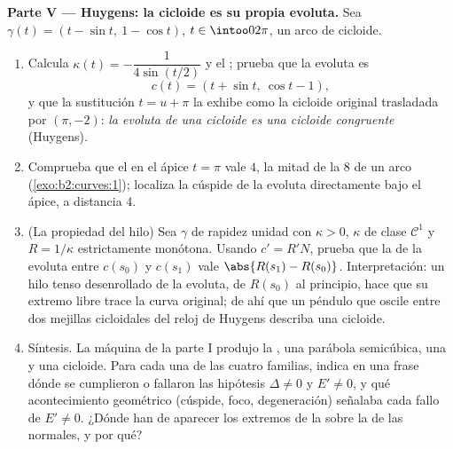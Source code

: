 \begin{problem}
\medskip
\noindent\textbf{Parte V --- Huygens: la cicloide es su propia
evoluta.} Sea $\gamma(t) = (t - \sin t,\ 1 - \cos t)$, $t \in
\intoo0{2\pi}$, un arco de cicloide.
\begin{enumerate}[resume]
  \item Calcula $\kappa(t) = -\dfrac1{4\sin(t/2)}$ y el
        ; prueba que la evoluta es
        \[
        c(t) = (t + \sin t,\ \cos t - 1),
        \]
        y que la sustitución $t = u + \pi$ la exhibe como la
        cicloide original trasladada por $(\pi, -2)$: \emph{la
        evoluta de una cicloide es una cicloide congruente}
        (Huygens).
  \item Comprueba que el  en el ápice $t = \pi$
        vale $4$, la mitad de la  $8$ de un arco
        (\cref{exo:b2:curves:1}); localiza la cúspide de la evoluta
        directamente bajo el ápice, a distancia $4$.
  \item (La propiedad del hilo) Sea $\gamma$ de rapidez unidad con
        $\kappa > 0$, $\kappa$ de clase $\mathcal C^1$ y $R =
        1/\kappa$ estrictamente monótona. Usando $c' = R'N$, prueba
        que la  de la evoluta entre $c(s_0)$ y
        $c(s_1)$ vale $\abs{R(s_1) - R(s_0)}$. Interpretación: un
        hilo tenso desenrollado de la evoluta, de  $R(s_0)$
        al principio, hace que su extremo libre trace la curva
        original; de ahí que un péndulo que oscile entre dos
        mejillas cicloidales del reloj de Huygens describa una
        cicloide.
  \item Síntesis. La máquina de la parte I produjo la , una
        parábola semicúbica, una  y una cicloide. Para cada
        una de las cuatro familias, indica en una frase dónde se
        cumplieron o fallaron las hipótesis $\Delta \neq 0$ y $E'
        \neq 0$, y qué acontecimiento geométrico (cúspide, foco,
        degeneración) señalaba cada fallo de $E' \neq 0$. ¿Dónde han
        de aparecer los extremos de la  sobre la
         de las normales, y por qué?
\end{enumerate}
\end{problem}
